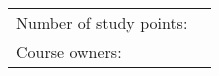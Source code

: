 \ 
\vspace{5cm}

\begin{center}

	
	\Large \textbf \organisatie
	
	\vspace{1.5cm}
	
	\HRule \\[0.4cm]
	
	\Huge \textbf \modulenaam
	
	\vspace{1.7cm}
	
	\Large \textbf  \modulecode
	
	\vspace{0.4cm}
	
	\HRule \\[1.5cm]
\end{center}
\vfill

\begin{tabular}{l l}
	Number of study points:  & \stdPunten\\
	Course owners: & \author\\
\end{tabular}
